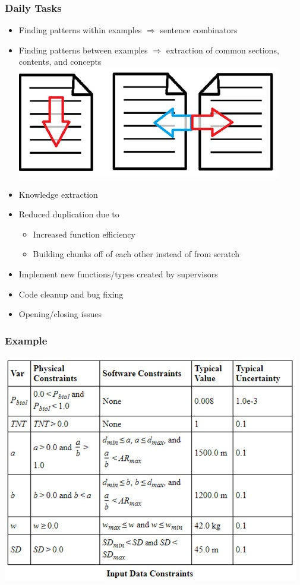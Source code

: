 \documentclass{beamer}
\begin{document}
\begin{frame}
\frametitle{Daily Tasks}
\begin{itemize}
 \item<1-> Finding patterns within examples $\Rightarrow$ sentence combinators
 \item<1-> Finding patterns between examples $\Rightarrow$ extraction of common sections, contents, and concepts
 \includegraphics[scale=0.70]{../WG2_11/WinAndBwExamples.jpg}
 \item<2-> Knowledge extraction
 \item<2-> Reduced duplication due to
  \begin{itemize}
   \item Increased function efficiency
   \item Building chunks off of each other instead of from scratch
  \end{itemize}
 \item<3-> Implement new functions/types created by supervisors
 \item<4-> Code cleanup and bug fixing
 \item<5-> Opening/closing issues
\end{itemize}
\end{frame}

\begin{frame}
\frametitle{Example}
\includegraphics[scale=0.70]{InDataConsEx.jpg}
\end{frame}
\end{document}
